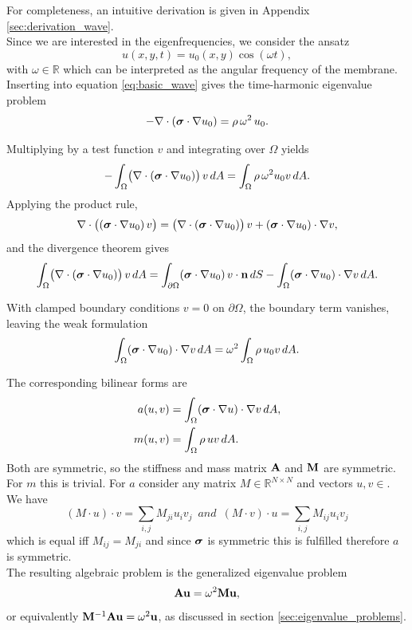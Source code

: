 For completeness, an intuitive derivation is given in Appendix \ref{sec:derivation_wave}.\\

Since we are interested in the eigenfrequencies, we consider the ansatz
\[
u(x,y,t) = u_0(x,y)\cos(\omega t),
\]
with $\omega \in \mathbb{R}$ which can be interpreted as the angular frequency of the membrane.\\
Inserting into equation \eqref{eq:basic_wave} gives the time-harmonic eigenvalue problem
\begin{equation*}
    -\nabla \cdot \left( \boldsymbol{\sigma} \cdot \nabla u_0 \right)
    = \rho \, \omega^2 \, u_0.
\end{equation*}

Multiplying by a test function $v$ and integrating over $\Omega$ yields
\begin{equation*}
    -\int_\Omega \bigl(\nabla \cdot (\boldsymbol{\sigma} \cdot \nabla u_0)\bigr)\, v \, dA
    = \int_\Omega \rho \, \omega^2 u_0 v \, dA.
\end{equation*}
Applying the product rule,
\[
\nabla \cdot \bigl((\boldsymbol{\sigma} \cdot \nabla u_0)\, v \bigr) 
= \bigl(\nabla \cdot (\boldsymbol{\sigma} \cdot \nabla u_0)\bigr)\, v 
+ (\boldsymbol{\sigma} \cdot \nabla u_0)\cdot \nabla v,
\]
and the divergence theorem gives
\begin{equation*}
    \int_\Omega \bigl(\nabla \cdot (\boldsymbol{\sigma} \cdot \nabla u_0)\bigr)\, v \, dA
    = \int_{\partial \Omega} (\boldsymbol{\sigma} \cdot \nabla u_0)\, v \cdot \mathbf{n}\, dS
    - \int_\Omega (\boldsymbol{\sigma} \cdot \nabla u_0)\cdot \nabla v \, dA.
\end{equation*}

With clamped boundary conditions $v=0$ on $\partial \Omega$, the boundary term vanishes, leaving the weak formulation
\begin{equation}
    \int_\Omega (\boldsymbol{\sigma} \cdot \nabla u_0)\cdot \nabla v \, dA
    = \omega^2 \int_\Omega \rho \, u_0 v \, dA.
\end{equation}

The corresponding bilinear forms are
\begin{align}
    a(u,v) &= \int_\Omega (\boldsymbol{\sigma} \cdot \nabla u)\cdot \nabla v \, dA, \\
    m(u,v) &= \int_\Omega \rho \, u v \, dA.
\end{align}
Both are symmetric, so the stiffness and mass matrix $\mathbf{A}$ and $\mathbf{M}$ are symmetric. For $m$ this is trivial. For $a$ consider any matrix $M\in \mathbb{R}^{N\times N}$ and vectors $u,v\in $. We have $$(M\cdot u)\cdot v=\sum_{i,j}M_{ji}u_iv_j\,\,\, and\,\,\, (M\cdot v)\cdot u=\sum_{i,j}M_{ij}u_iv_j$$ which is equal iff $M_{ij}=M_{ji}$ and since $\boldsymbol{\sigma}$ is symmetric this is fulfilled therefore $a$ is symmetric.\\ 
The resulting algebraic problem is the generalized eigenvalue problem
\[
\mathbf{A} \mathbf{u} = \omega^2 \mathbf{M} \mathbf{u},
\]
or equivalently $\mathbf{M}^{-1}\mathbf{A} \mathbf{u} = \omega^2 \mathbf{u}$, as discussed in section \ref{sec:eigenvalue_problems}.\\

